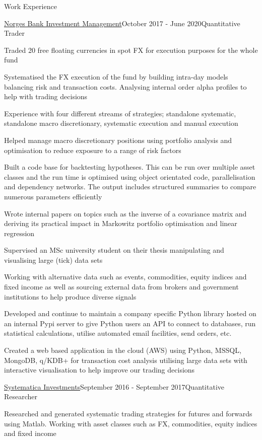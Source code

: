 \documentclass{resume} %
\begin{document}
\begin{rSection}{Work Experience}
\begin{rSubsection}{\href{https://www.nbim.no/}{Norges Bank Investment Management}}{October 2017 - June 2020}{Quantitative Trader}{}
	\item Traded 20 free floating currencies in spot FX for execution purposes for the whole fund
	\item Systematised the FX execution of the fund by building intra-day models balancing risk and transaction costs. Analysing internal order alpha profiles to help with trading decisions
	\item Experience with four different streams of strategies; standalone systematic, standalone macro discretionary, systematic execution and manual execution
	\item Helped manage macro discretionary positions using portfolio analysis and optimisation to reduce exposure to a range of risk factors
	\item Built a code base for backtesting hypotheses. This can be run over multiple asset classes and the run time is optimised using object orientated code, parallelisation and dependency networks. The output includes structured summaries to compare numerous parameters efficiently
	\item Wrote internal papers on topics such as the inverse of a covariance matrix and deriving its practical impact in Markowitz portfolio optimisation and linear regression
	\item Supervised an MSc university student on their thesis manipulating and visualising large (tick) data sets
	\item Working with alternative data such as events, commodities, equity indices and fixed income as well as sourcing external data from brokers and government institutions to help produce diverse signals
	\item Developed and continue to maintain a company specific Python library hosted on an internal Pypi server to give Python users an API to connect to databases, run statistical calculations, utilise automated email facilities, send orders, etc.
	\item Created a web based application in the cloud (AWS) using Python, MSSQL, MongoDB, q/KDB+ for transaction cost analysis utilising large data sets with interactive visualisation to help improve our trading decisions
\end{rSubsection}
\begin{rSubsection}{\href{https://www.systematica.com/}{Systematica Investments}}{September 2016 - September 2017}{Quantitative Researcher}{}
	\item Researched and generated systematic trading strategies for futures and forwards using Matlab. Working with asset classes such as FX, commodities, equity indices and fixed income

\end{rSubsection}
\end{rSection}
\end{document}
